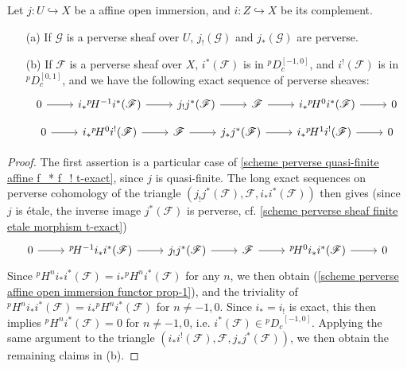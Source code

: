 \begin{corollary}\label{scheme perverse affine open immersion functor prop}
Let $j:U\hookrightarrow X$ be a affine open immersion, and $i:Z\hookrightarrow X$ be its complement. 
\begin{enumerate}
    \item[(a)] If $\mathscr{G}$ is a perverse sheaf over $U$, $j_!(\mathscr{G})$ and $j_*(\mathscr{G})$ are perverse.
    \item[(b)] If $\mathscr{F}$ is a perverse sheaf over $X$, $i^*(\mathscr{F})$ is in ${^p\!D_c^{[-1,0]}}$, and $i^!(\mathscr{F})$ is in ${^p\!D_c^{[0,1]}}$, and we have the following exact sequence of perverse sheaves:
    \begin{equation}\label{scheme perverse affine open immersion functor prop-1}
    \begin{tikzcd}
    0\ar[r]&i_*{^p\!H^{-1}}i^*(\mathscr{F})\ar[r]&j_!j^*(\mathscr{F})\ar[r]&\mathscr{F}\ar[r]&i_*{^p\!H^0}i^*(\mathscr{F})\ar[r]&0
    \end{tikzcd}
    \end{equation}
    \vspace*{-3mm}
    \begin{equation}\label{scheme perverse affine open immersion functor prop-2}
    \begin{tikzcd}
    0\ar[r]&i_*{^p\!H^{0}}i^!(\mathscr{F})\ar[r]&\mathscr{F}\ar[r]&j_*j^*(\mathscr{F})\ar[r]&i_*{^p\!H^1}i^!(\mathscr{F})\ar[r]&0
    \end{tikzcd}
    \end{equation}
\end{enumerate}
\end{corollary}
\begin{proof}
The first assertion is a particular case of \cref{scheme perverse quasi-finite affine f_* f_! t-exact}, since $j$ is quasi-finite. The long exact sequences on perverse cohomology of the triangle $(j_!j^*(\mathscr{F}),\mathscr{F},i_*i^*(\mathscr{F}))$ then gives (since $j$ is \'etale, the inverse image $j^*(\mathscr{F})$ is perverse, cf. \cref{scheme perverse sheaf finite etale morphism t-exact})
\[\begin{tikzcd}
0\ar[r]&{^p\!H^{-1}}i_*i^*(\mathscr{F})\ar[r]&j_!j^*(\mathscr{F})\ar[r]&\mathscr{F}\ar[r]&{^p\!H^0}i_*i^*(\mathscr{F})\ar[r]&0
\end{tikzcd}\]
Since ${^p\!H^n}i_*i^*(\mathscr{F})=i_*{^p\!H^n}i^*(\mathscr{F})$ for any $n$, we then obtain (\ref{scheme perverse affine open immersion functor prop-1}), and the triviality of ${^p\!H^ni_*i^*(\mathscr{F})}=i_*{^p\!H^n}i^*(\mathscr{F})$ for $n\neq -1,0$. Since $i_*=i_!$ is exact, this then implies ${^p\!H^n}i^*(\mathscr{F})=0$ for $n\neq -1,0$, i.e. $i^*(\mathscr{F})\in {^p\!D_c}^{[-1,0]}$. Applying the same argument to the triangle $(i_*i^!(\mathscr{F}),\mathscr{F},j_*j^*(\mathscr{F}))$, we then obtain the remaining claims in (b).
\end{proof}

